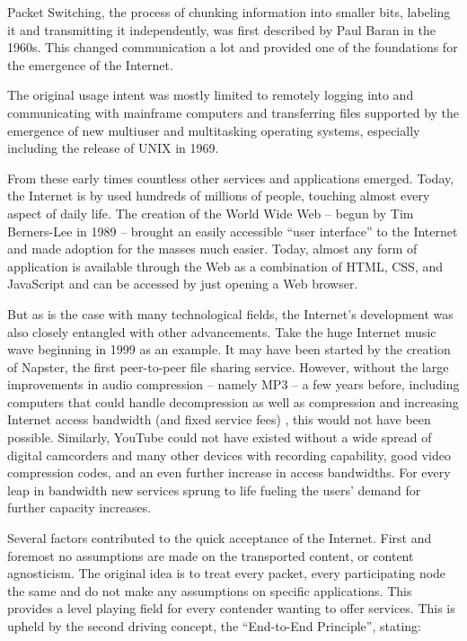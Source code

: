Packet Switching, the process of chunking information into smaller bits, labeling it and transmitting it independently, was first described by Paul Baran in the 1960s\cite{baran1964distributed}. This changed communication a lot and provided one of the foundations for the emergence of the Internet. 

The original usage intent was mostly limited to remotely logging into and communicating with mainframe computers and transferring files supported by the emergence of new multiuser and multitasking operating systems, especially including the release of UNIX in 1969.

From these early times countless other services and applications emerged. Today, the Internet is by used hundreds of millions of people, touching almost every aspect of daily life. The creation of the World Wide Web -- begun by Tim Berners-Lee in 1989 -- brought an easily accessible ``user interface'' to the Internet and made adoption for the masses much easier. Today, almost any form of application is available through the Web as a combination of \gls{HTML}, \gls{CSS}, and JavaScript and can be accessed by just opening a Web browser.

But as is the case with many technological fields, the Internet's development was also closely entangled with other advancements. Take the huge Internet music wave beginning in 1999 as an example. It may have been started by the creation of Napster, the first peer-to-peer file sharing service. However, without the large improvements in audio compression -- namely MP3 -- a few years before, including computers that could handle decompression as well as compression and increasing Internet access bandwidth (and fixed service fees) , this would not have been possible. Similarly, YouTube could not have existed without a wide spread of digital camcorders and many other devices with recording capability, good video compression codes, and an even further increase in access bandwidths.
 For every leap in bandwidth new services sprung to life fueling the users' demand for further capacity increases. 


Several factors contributed to the quick acceptance of the Internet. First and foremost no assumptions are made on the transported content, or content agnosticism. The original idea is to treat every packet, every participating node the same and do not make any assumptions on specific applications. This provides a level playing field for every contender wanting to offer services. This is upheld by the second driving concept, the ``End-to-End Principle'', \cite{saltzer1984end2end} stating:

